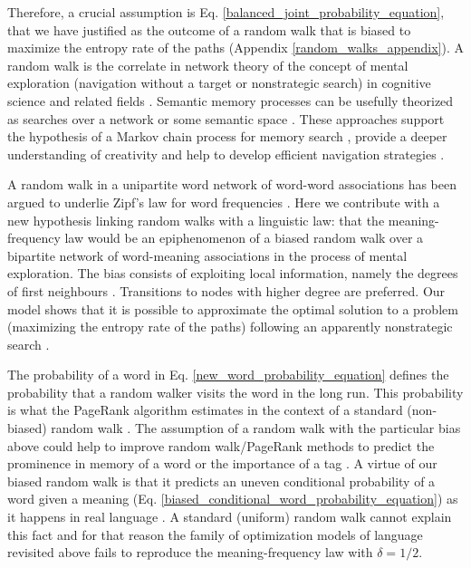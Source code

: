 \documentclass{article}
\begin{document}

Therefore, a crucial assumption is Eq. \ref{balanced_joint_probability_equation}, that we have justified as the outcome of a random walk that is biased to maximize the entropy rate of the paths (Appendix \ref{random_walks_appendix}). A random walk is the correlate in network theory of the concept of mental exploration (navigation without a target or nonstrategic search) %
in cognitive science and related fields \cite{Baronchelli2013a}. Semantic memory
processes can be usefully theorized as searches over a network \cite{Thomson2014a, Abbot2015a} or some semantic space \cite{Smith2013a}. These approaches  support the hypothesis of a Markov chain process for memory search \cite{Bourgin2014a}, provide a deeper understanding of creativity \cite{Kenett2016a} and help to develop efficient navigation strategies \cite{Capitan2012a}.

A random walk in a unipartite word network of word-word associations has been argued to underlie Zipf's law for word frequencies \cite{Allegrini2003a}. %
Here we contribute with a new hypothesis linking random walks with a linguistic law: that the meaning-frequency law would be an epiphenomenon of a biased random walk over a bipartite network of word-meaning associations in the process of mental exploration. The bias consists of exploiting local information, namely the degrees of first neighbours \cite{Sinatra2011a}. Transitions to nodes with higher degree are preferred. Our model shows that it is possible to approximate the optimal solution to a problem (maximizing the entropy rate of the paths) following an apparently nonstrategic search \cite{Hills2012a,Abbot2015a}.

The probability of a word in Eq. \ref{new_word_probability_equation} defines the probability that a random walker visits the word in the long run. This probability is what the PageRank algorithm estimates in the context of a standard (non-biased) random walk \cite{Page1998a}. The assumption of a random walk with the particular bias above could help to improve random walk/PageRank methods to predict the prominence in memory of a word \cite{Griffiths2007a} or the importance of a tag \cite{Jaschke2007a}. 
A virtue of our biased random walk is that it predicts an uneven conditional probability of a word given a meaning (Eq. \ref{biased_conditional_word_probability_equation}) as it happens in real language \cite{Snodgrass1980a}. A standard (uniform) random walk cannot explain this fact and for that reason the family of optimization models of language revisited above fails to reproduce the meaning-frequency law with $\delta = 1/2$.    
 
\end{document}

